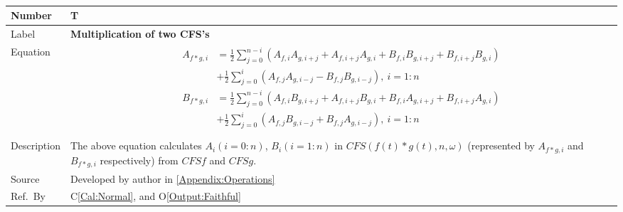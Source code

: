 \documentclass[12pt]{article}
\newcommand{\colAwidth}{0.13\textwidth}
\newcommand{\colBwidth}{0.82\textwidth}
\newcounter{theorynum} %
\newcommand{\calref}[1]{C\ref{#1}}
\newcommand{\oref}[1]{O\ref{#1}}
\begin{document}
~\newline

\noindent
\begin{minipage}{\textwidth}
	\renewcommand*{\arraystretch}{1.5}
	\begin{tabular}{| p{\colAwidth} | p{\colBwidth}|}
		\hline
		\rowcolor[gray]{0.9}
		Number& T{theorynum}\thetheorynum \label{T:Multiplication}\\
		\hline
		Label&\bf Multiplication of two CFS's\\
		\hline
		Equation&  
		\begin{equation}
		\begin{aligned}
		A_{f*g, i}&=\frac{1}{2}\sum_{j=0}^{n-i}(A_{f,i}A_{g,i+j}
		+A_{f, i+j}A_{g, i}+B_{f,i}B_{g,i+j}+B_{f,i+j}B_{g,i})\\
		&+\frac{1}{2}\sum_{j=0}^{i}(A_{f,j}A_{g,i-j}-B_{f,j}B_{g,i-j}),
		~i=1:n\\
		B_{f*g, i}&=\frac{1}{2}\sum_{j=0}^{n-i}(A_{f,i}B_{g,i+j}
		+A_{f, i+j}B_{g, i}+B_{f,i}A_{g,i+j}+B_{f,i+j}A_{g,i})\\
		&+\frac{1}{2}\sum_{j=0}^{i}(A_{f,j}B_{g,i-j}+B_{f,j}A_{g,i-j}),
		~i=1:n\\
		\end{aligned}
		\end{equation}\\
		\hline
		Description & The above equation calculates $A_i(i=0:n)$, 
		$B_i(i=1:n)$ in $\mathit{CFS}(f(t)*g(t), n, \omega)$ 
		(represented by $A_{f*g, i}$ and $B_{f*g, i}$ respectively) 
		from $\mathit{CFSf}$ and $\mathit{CFSg}$.\\
		\hline
		Source & Developed by author in \autoref{Appendix:Operations}\\
		\hline
		Ref.\ By &  \calref{Cal:Normal}, 
		and \oref{Output:Faithful}\\
		\hline
	\end{tabular}
\end{minipage}\\
\end{document}
